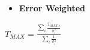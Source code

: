 \documentclass{beamer}
\begin{document}
\begin{frame}
\begin{minipage}[t]{\paperwidth}
    \begin{tcolorbox}[colback=UNL@Cream!5,colframe=UNL@Cream!70,title=\textcolor{UMN@Maroon}{\textbf{Time Measurement}}]    
  \begin{columns}
    \begin{column}{0.37\textwidth} 
      \begin{itemize}
       \item{ \color{UMN@Maroon} \textbf{Error Weighted}}\\ 
       \end{itemize}
        $ T_{MAX} = \frac{{\displaystyle\sum_{i}} \frac{T_{MAX,i} }{\sigma_i^2} }{ {\displaystyle\sum_{i}} \frac{1}{\sigma_i^2} } $ \\
        \end{column}
     \end{columns}      
        
         
    

\end{tcolorbox}
\end{minipage}
\end{frame}
\end{document}
